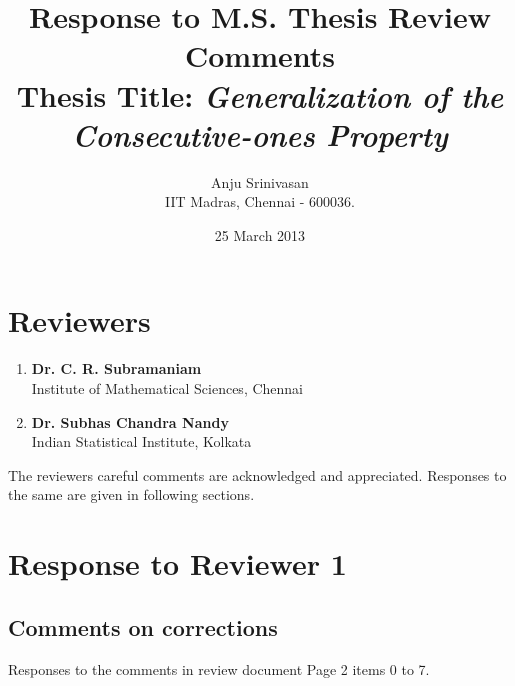 \documentclass[12pt,a4paper]{article}
\begin{document}
\title{Response to M.S. Thesis Review Comments\\ 
 {Thesis Title: {\em Generalization of the Consecutive-ones Property}}}
\author{Anju Srinivasan\\IIT Madras, Chennai - 600036.}
\date{25 March 2013}

\maketitle

\onehalfspacing

\section{Reviewers}

\begin{enumerate}
\item  {\bf Dr. C. R. Subramaniam}\\ Institute of Mathematical Sciences, Chennai
\item  {\bf Dr. Subhas Chandra Nandy}\\ Indian Statistical Institute, Kolkata
\end{enumerate}
The reviewers careful comments are acknowledged and
appreciated. Responses to the same are given in following sections.

\section{Response to Reviewer 1}


\subsection{Comments on corrections}
Responses to the comments in review document Page 2 items 0 to 7.
\end{document}

